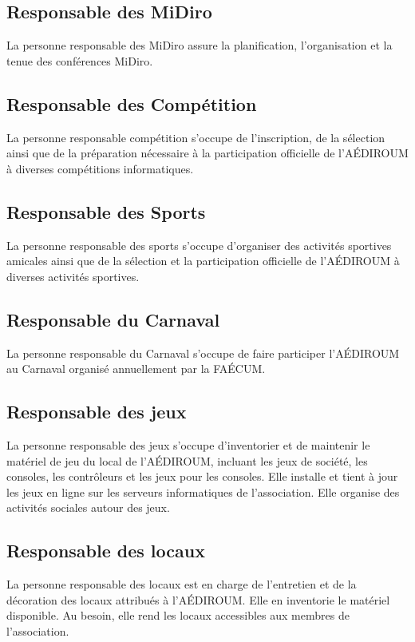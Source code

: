 \documentclass{aediroum}
\begin{document}
\subsection{Responsable des MiDiro}\label{sec:responsable-midiro}
La personne responsable des MiDiro assure la planification, l'organisation et la tenue des conférences MiDiro.

\subsection{Responsable des Compétition}\label{sec:responsable-competition}
La personne responsable compétition s'occupe de l'inscription, de la sélection ainsi que de la préparation nécessaire à la participation officielle de l'AÉDIROUM à diverses compétitions informatiques.

\subsection{Responsable des Sports}\label{sec:responsable-sport}
La personne responsable des sports s'occupe d'organiser des activités sportives amicales ainsi que de la sélection et la participation officielle de l'AÉDIROUM à diverses activités sportives.

\subsection{Responsable du Carnaval}\label{sec:responsable-carnaval}
La personne responsable du Carnaval s'occupe de faire participer l'AÉDIROUM au Carnaval organisé annuellement par la FAÉCUM.

\subsection{Responsable des jeux}\label{sec:responsable-serveur}
La personne responsable des jeux s’occupe d’inventorier et de maintenir le matériel de
jeu du local de l’AÉDIROUM, incluant les jeux de société, les consoles, les contrôleurs et
les jeux pour les consoles. Elle installe et tient à jour les jeux en ligne sur les serveurs
informatiques de l’association. Elle organise des activités sociales autour des jeux.

\subsection{Responsable des locaux}
La personne responsable des locaux est en charge de l’entretien et de la décoration des locaux attribués à l’AÉDIROUM. Elle en inventorie le matériel disponible. Au besoin, elle rend les locaux accessibles aux membres de l’association.
\end{document}
